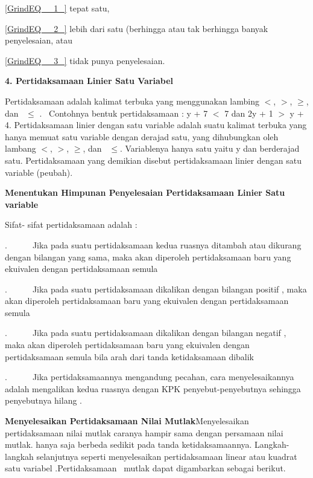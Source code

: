 \documentclass[11pt,fleqn]{book} %
\begin{document}
\noindent  \eqref{GrindEQ__1_} tepat satu,

\noindent  \eqref{GrindEQ__2_} lebih dari satu (berhingga atau tak berhingga banyak penyelesaian, atau

\noindent  \eqref{GrindEQ__3_} tidak punya penyelesaian.

\noindent \textbf{4. Pertidaksamaan Linier Satu Variabel}

\noindent Pertidaksamaan adalah kalimat terbuka yang menggunakan lambing $<$, $>$, $\mathrm{\ge}$, dan~ $\mathrm{\le}$ . ~Contohnya bentuk pertidaksamaan : y + 7 $<$ 7 dan 2y + 1 $>$ y + 4. Pertidaksamaan linier dengan satu variable adalah suatu kalimat terbuka yang hanya memuat satu variable dengan derajad satu, yang dihubungkan oleh lambang $<$, $>$, $\mathrm{\ge}$, dan~ $\mathrm{\le}$. Variablenya hanya satu yaitu y dan berderajad satu. Pertidaksamaan yang demikian disebut pertidaksamaan linier dengan satu variable (peubah).

\noindent \textbf{Menentukan Himpunan Penyelesaian Pertidaksamaan Linier Satu variable}

\noindent Sifat- sifat pertidaksamaan adalah :

.~~~~~~Jika pada suatu pertidaksamaan kedua ruasnya ditambah atau dikurang dengan bilangan yang sama, maka akan diperoleh pertidaksamaan baru yang ekuivalen dengan pertidaksamaan semula

.~~~~~~Jika pada suatu pertidaksamaan dikalikan dengan bilangan positif , maka akan diperoleh pertidaksamaan baru yang ekuivalen dengan pertidaksamaan semula

.~~~~~~Jika pada suatu pertidaksamaan dikalikan dengan bilangan negatif , maka akan diperoleh pertidaksamaan baru yang ekuivalen dengan pertidaksamaan semula bila arah dari tanda ketidaksamaan dibalik ~

.~~~~~~Jika pertidaksamaannya mengandung pecahan, cara menyelesaikannya adalah mengalikan kedua ruasnya dengan KPK penyebut-penyebutnya sehingga penyebutnya hilang .

\noindent \textbf{}

\noindent \textbf{Menyelesaikan Pertidaksamaan Nilai Mutlak}Menyelesaikan pertidaksamaan nilai mutlak caranya hampir sama dengan persamaan nilai mutlak. hanya saja berbeda sedikit pada tanda ketidaksamaannya. Langkah-langkah selanjutnya seperti menyelesaikan pertidaksamaan linear atau kuadrat satu variabel .Pertidaksamaan~ mutlak dapat digambarkan sebagai berikut.
\end{document}
